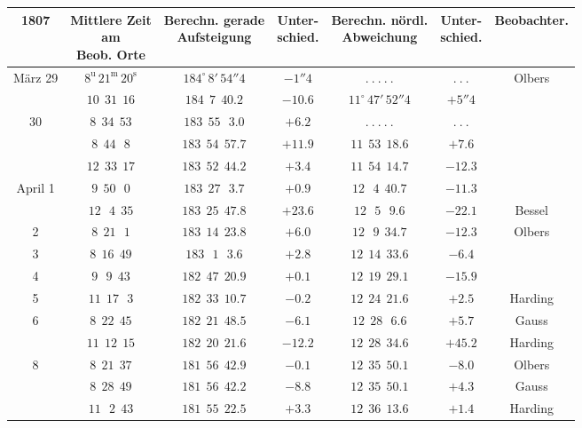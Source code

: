 \begin{center}\begingroup
\fontsize{8}{10}\selectfont
\setlength{\tabcolsep}{2.5pt}\renewcommand{\arraystretch}{1.15}
\begin{tabular}{c|c|c|c|c|c|c}
1807 & \shortstack{Mittlere Zeit\\am\\Beob. Orte} & \shortstack{Berechn. gerade\\Aufsteigung\\\VestaRATwoNinetyOne{}} & \shortstack{Unter-\\schied.} & \shortstack{Berechn. nördl.\\Abweichung\\\VestaDecTwoNinetyOne{}} & \shortstack{Unter-\\schied.} & Beobachter. \\ \hline
März 29 & $8^{\text{u}}\,21^{\text{m}}\,20^{\text{s}}$ & $184^\circ\,8'\,54''4$ & $-1''4$ & $.\ .\ .\ .\ .$ & $.\ .\ .$ & Olbers \\
        & $10\ \ 31\ \ 16$ & $184\ \ 7\ \ 40.2$ & $-10.6$ & $11^\circ\,47'\,52''4$ & $+5''4$ & \\
30 & $8\ \ 34\ \ 53$ & $183\ \ 55\ \ \ 3.0$ & $+6.2$ & $.\ .\ .\ .\ .$ & $.\ .\ .$ & \\
   & $8\ \ 44\ \ \ 8$ & $183\ \ 54\ \ 57.7$ & $+11.9$ & $11\ \ 53\ \ 18.6$ & $+7.6$ & \\
   & $12\ \ 33\ \ 17$ & $183\ \ 52\ \ 44.2$ & $+3.4$ & $11\ \ 54\ \ 14.7$ & $-12.3$ & \\
April 1 & $9\ \ 50\ \ \ 0$ & $183\ \ 27\ \ \ 3.7$ & $+0.9$ & $12\ \ \ 4\ \ 40.7$ & $-11.3$ & \\
   & $12\ \ \ 4\ \ 35$ & $183\ \ 25\ \ 47.8$ & $+23.6$ & $12\ \ \ 5\ \ \ 9.6$ & $-22.1$ & Bessel \\
2 & $8\ \ 21\ \ \ 1$ & $183\ \ 14\ \ 23.8$ & $+6.0$ & $12\ \ \ 9\ \ 34.7$ & $-12.3$ & Olbers \\
3 & $8\ \ 16\ \ 49$ & $183\ \ \ 1\ \ \ 3.6$ & $+2.8$ & $12\ \ 14\ \ 33.6$ & $-6.4$ & \\
4 & $9\ \ \ 9\ \ 43$ & $182\ \ 47\ \ 20.9$ & $+0.1$ & $12\ \ 19\ \ 29.1$ & $-15.9$ & \\
5 & $11\ \ 17\ \ \ 3$ & $182\ \ 33\ \ 10.7$ & $-0.2$ & $12\ \ 24\ \ 21.6$ & $+2.5$ & Harding \\
6 & $8\ \ 22\ \ 45$ & $182\ \ 21\ \ 48.5$ & $-6.1$ & $12\ \ 28\ \ \ 6.6$ & $+5.7$ & Gauss \\
  & $11\ \ 12\ \ 15$ & $182\ \ 20\ \ 21.6$ & $-12.2$ & $12\ \ 28\ \ 34.6$ & $+45.2$ & Harding \\
8 & $8\ \ 21\ \ 37$ & $181\ \ 56\ \ 42.9$ & $-0.1$ & $12\ \ 35\ \ 50.1$ & $-8.0$ & Olbers \\
  & $8\ \ 28\ \ 49$ & $181\ \ 56\ \ 42.2$ & $-8.8$ & $12\ \ 35\ \ 50.1$ & $+4.3$ & Gauss \\
  & $11\ \ \ 2\ \ 43$ & $181\ \ 55\ \ 22.5$ & $+3.3$ & $12\ \ 36\ \ 13.6$ & $+1.4$ & Harding
\end{tabular}\endgroup\end{center}
